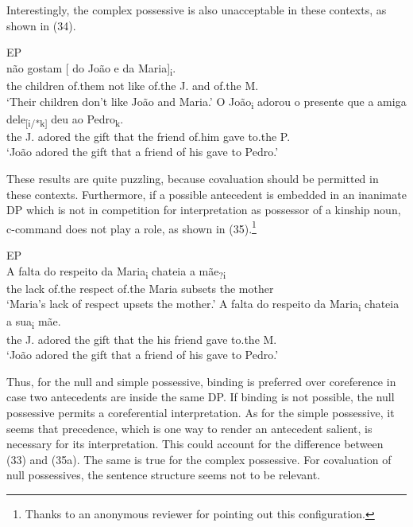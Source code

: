 \documentclass[output=paper]{langsci/langscibook}
\begin{document}
Interestingly, the complex possessive is also unacceptable in these contexts, as shown in (34).

\ea%
         EP\label{ex:wein:34}\\
    \ea  
    \gll {} não gostam [ do João e da Maria]\textsubscript{i}.\\
         {} the children of.them not like {} of.the J. and of.the M.\\
    \glt ‘Their children don’t like João and Maria.’
    \ex  
    \gll O João\textsubscript{i} adorou o presente que a amiga dele\textsubscript{[i/*k]} deu ao Pedro\textsubscript{k}.\\
         the J. adored the gift that the friend of.him gave to.the P.\\
    \glt ‘João adored the gift that a friend of his gave to Pedro.’
    \z
\z

These results are quite puzzling, because covaluation should be permitted in these contexts. Furthermore, if a possible antecedent is embedded in an inanimate DP which is not in competition for interpretation as possessor of a kinship noun, c-command does not play a role, as shown in (35).\footnote{Thanks to an anonymous reviewer for pointing out this configuration.}

\ea%
         EP\label{ex:wein:35}\\
    \ea            
    \gll A falta do respeito da Maria\textsubscript{i} chateia a mãe\textsubscript{?i}\\
         the lack of.the respect of.the Maria subsets the mother\\
    \glt ‘Maria’s lack of respect upsets the mother.’
    \ex  
    \gll A falta do respeito da Maria\textsubscript{i} chateia a sua\textsubscript{i} mãe.\\
         the J. adored the gift that the his friend gave to.the M.\\
    \glt ‘João adored the gift that a friend of his gave to Pedro.’ 
    \z
\z
{}

Thus, for the null and simple possessive, binding is preferred over coreference in case two antecedents are inside the same DP. If binding is not possible, the null possessive permits a coreferential interpretation. As for the simple possessive, it seems that precedence, which is one way to render an antecedent salient, is necessary for its interpretation. This could account for the difference between (33) and (35a). The same is true for the complex possessive. For covaluation of null possessives, the sentence structure seems not to be relevant.
\end{document}
